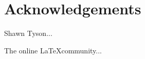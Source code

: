 \chapter*{Acknowledgements}
\label{ch:acknowledgements}

Shawn Tyson...

The online \LaTeX community...
